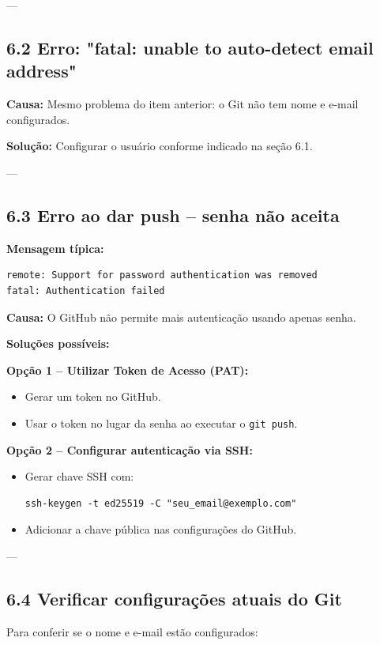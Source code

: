 \documentclass[12pt,a4paper]{article}
\begin{document}
---

\subsection*{6.2 Erro: "fatal: unable to auto-detect email address"}

\textbf{Causa:}  
Mesmo problema do item anterior: o Git não tem nome e e-mail configurados.

\textbf{Solução:}  
Configurar o usuário conforme indicado na seção 6.1.

---

\subsection*{6.3 Erro ao dar push – senha não aceita}

\textbf{Mensagem típica:}

\begin{verbatim}
remote: Support for password authentication was removed
fatal: Authentication failed
\end{verbatim}

\textbf{Causa:}  
O GitHub não permite mais autenticação usando apenas senha.

\textbf{Soluções possíveis:}

\textbf{Opção 1 – Utilizar Token de Acesso (PAT):}
\begin{itemize}
    \item Gerar um token no GitHub.
    \item Usar o token no lugar da senha ao executar o \texttt{git push}.
\end{itemize}

\textbf{Opção 2 – Configurar autenticação via SSH:}
\begin{itemize}
    \item Gerar chave SSH com:
\begin{verbatim}
ssh-keygen -t ed25519 -C "seu_email@exemplo.com"
\end{verbatim}
    \item Adicionar a chave pública nas configurações do GitHub.
\end{itemize}

---

\subsection*{6.4 Verificar configurações atuais do Git}

Para conferir se o nome e e-mail estão configurados:
\end{document}

